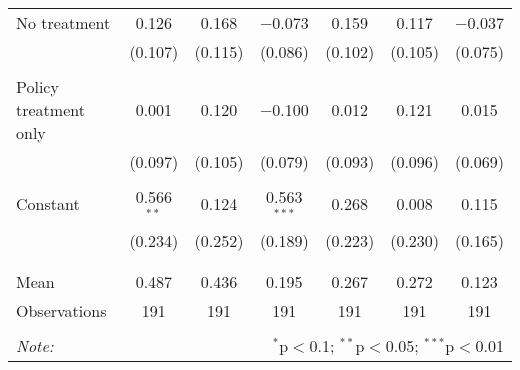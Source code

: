 \begin{tabular}{@{\extracolsep{5pt}}lcccccc}
 No treatment & 0.126 & 0.168 & $-$0.073 & 0.159 & 0.117 & $-$0.037 \\ 
  & (0.107) & (0.115) & (0.086) & (0.102) & (0.105) & (0.075) \\ 
  & & & & & & \\ 
 Policy treatment only & 0.001 & 0.120 & $-$0.100 & 0.012 & 0.121 & 0.015 \\ 
  & (0.097) & (0.105) & (0.079) & (0.093) & (0.096) & (0.069) \\ 
  & & & & & & \\ 
 Constant & 0.566$^{**}$ & 0.124 & 0.563$^{***}$ & 0.268 & 0.008 & 0.115 \\ 
  & (0.234) & (0.252) & (0.189) & (0.223) & (0.230) & (0.165) \\ 
  & & & & & & \\ 
\hline \\[-1.8ex] 
Mean & 0.487 & 0.436 & 0.195 & 0.267 & 0.272 & 0.123 \\ 
Observations & 191 & 191 & 191 & 191 & 191 & 191 \\ 
\hline 
\hline \\[-1.8ex] 
\textit{Note:}  & \multicolumn{6}{r}{$^{*}$p$<$0.1; $^{**}$p$<$0.05; $^{***}$p$<$0.01} \\ 
\end{tabular} 
